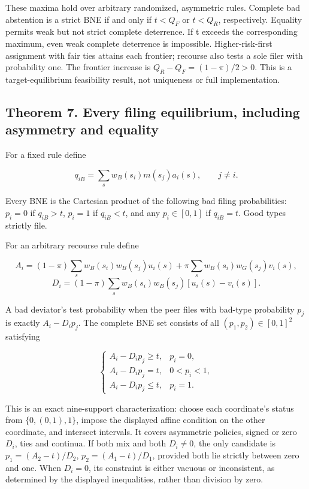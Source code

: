 \documentclass[
  11pt,
]{article}
\begin{document}
These maxima hold over arbitrary randomized, asymmetric rules. Complete
bad abstention is a strict BNE if and only if \(t<Q_F\) or \(t<Q_R\),
respectively. Equality permits weak but not strict complete deterrence.
If t exceeds the corresponding maximum, even weak complete deterrence is
impossible. Higher-risk-first assignment with fair ties attains each
frontier; recourse also tests a sole filer with probability one. The
frontier increase is \(Q_R-Q_F=(1-\pi)/2>0\). This is a
target-equilibrium feasibility result, not uniqueness or full
implementation.

\subsection{Theorem 7. Every filing equilibrium, including asymmetry and
equality}\label{theorem-7.-every-filing-equilibrium-including-asymmetry-and-equality}

For a fixed rule define

\[q_{iB}=\sum_s w_B(s_i)m(s_j)a_i(s),\qquad j\ne i.\]

Every BNE is the Cartesian product of the following bad filing
probabilities: \(p_i=0\) if \(q_{iB}>t\), \(p_i=1\) if \(q_{iB}<t\), and
any \(p_i\in[0,1]\) if \(q_{iB}=t\). Good types strictly file.

For an arbitrary recourse rule define

\[A_i=(1-\pi)\sum_s w_B(s_i)w_B(s_j)u_i(s)
 +\pi\sum_s w_B(s_i)w_G(s_j)v_i(s),\]
\[D_i=(1-\pi)\sum_s w_B(s_i)w_B(s_j)[u_i(s)-v_i(s)].\]

A bad deviator's test probability when the peer files with bad-type
probability \(p_j\) is exactly \(A_i-D_i p_j\). The complete BNE set
consists of all \((p_1,p_2)\in[0,1]^2\) satisfying

\[\begin{cases}
 A_i-D_i p_j\geq t,&p_i=0,\\
 A_i-D_i p_j=t,&0<p_i<1,\\
 A_i-D_i p_j\leq t,&p_i=1.
\end{cases}\]

This is an exact nine-support characterization: choose each coordinate's
status from \(\{0,(0,1),1\}\), impose the displayed affine condition on
the other coordinate, and intersect intervals. It covers asymmetric
policies, signed or zero \(D_i\), ties and continua. If both mix and
both \(D_i\ne0\), the only candidate is \(p_1=(A_2-t)/D_2\),
\(p_2=(A_1-t)/D_1\), provided both lie strictly between zero and one.
When \(D_i=0\), its constraint is either vacuous or inconsistent, as
determined by the displayed inequalities, rather than division by zero.
\end{document}
